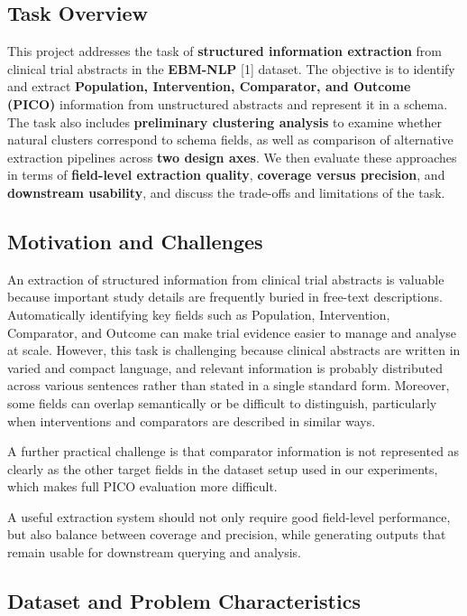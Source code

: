 \documentclass{article}
\begin{document}
\subsection{Task Overview}


This project addresses the task of \textbf{structured information extraction} from clinical trial abstracts in the \textbf{EBM-NLP} [1] dataset. The objective is to identify and extract \textbf{Population, Intervention, Comparator, and Outcome (PICO)} information from unstructured abstracts and represent it in a schema. The task also includes \textbf{preliminary clustering analysis} to examine whether natural clusters correspond to schema fields, as well as comparison of alternative extraction pipelines across \textbf{two design axes}. We then evaluate these approaches in terms of \textbf{field-level extraction quality}, \textbf{coverage versus precision}, and \textbf{downstream usability}, and discuss the trade-offs and limitations of the task.

\subsection{Motivation and Challenges}


An extraction of structured information from clinical trial abstracts is valuable because important study details are frequently buried in free-text descriptions. Automatically identifying key fields such as Population, Intervention, Comparator, and Outcome can make trial evidence easier to manage and analyse at scale. However, this task is challenging because clinical abstracts are written in varied and compact language, and relevant information is probably distributed across various sentences rather than stated in a single standard form. Moreover, some fields can overlap semantically or be difficult to distinguish, particularly when interventions and comparators are described in similar ways. 

A further practical challenge is that comparator information is not represented as clearly as the other target fields in the dataset setup used in our experiments, which makes full PICO evaluation more difficult. 

A useful extraction system should not only require good field-level performance, but also balance between coverage and precision, while generating outputs that remain usable for downstream querying and analysis.

\subsection{Dataset and Problem Characteristics}
\end{document}
